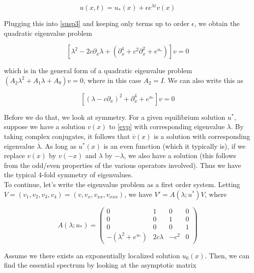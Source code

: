 \documentclass[12pt]{article}
\begin{document}
\begin{equation}
u(x,t) = u_*(x) + \epsilon e^{\lambda t} v(x)
\end{equation}

Plugging this into \eqref{susp3} and keeping only terms up to order $\epsilon$, we obtain the quadratic eigenvalue problem

\begin{equation}\label{evp}
[\lambda^2 - 2 c \partial_x \lambda + (\partial_x^4 + c^2 \partial_x^2 + e^{u_*})]v = 0
\end{equation}

which is in the general form of a quadratic eigenvalue problem $(A_2 \lambda^2 + A_1 \lambda + A_0)v = 0$, where in this case $A_2 = I$. We can also write this as

\begin{equation}\label{evp2}
[(\lambda - c \partial_x)^2 + \partial_x^4 + e^{u_*}]v = 0
\end{equation}

Before we do that, we look at symmetry. For a given equilibrium solution $u^*$, suppose we have a solution $v(x)$ to \eqref{evp} with corresponding eigenvalue $\lambda$. By taking complex conjugates, it follows that $\overline{v}(x)$ is a solution with corresponding eigenvalue $\overline{\lambda}$. As long as $u^*(x)$ is an even function (which it typically is), if we replace $v(x)$ by $v(-x)$ and $\lambda$ by $-\lambda$, we also have a solution (this follows from the odd/even properties of the various operators involved). Thus we have the typical 4-fold symmetry of eigenvalues.\\ 

To continue, let's write the eigenvalue problem as a first order system. Letting $V = (v_1, v_2, v_3, v_4) = (v, v_x, v_{xx}, v_{xxx})$, we have $V' = A(\lambda; u^*)V$, where

\begin{equation}
A(\lambda; u_*) = \begin{pmatrix}
0 & 1 & 0 & 0 \\
0 & 0 & 1 & 0 \\
0 & 0 & 0 & 1 \\
-(\lambda^2 + e^{u_*}) & 2 c \lambda & -c^2 & 0 
\end{pmatrix}
\end{equation}

Assume we there exists an exponentially localized solution $u_0(x)$. Then, we can find the essential spectrum by looking at the asymptotic matrix
\end{document}
